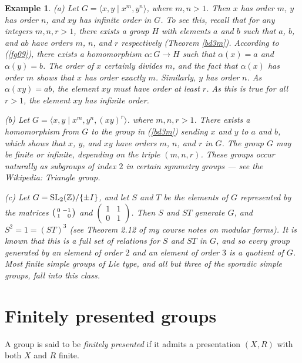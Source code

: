 \documentclass[a4paper,11pt,final,openany]{memoir}%
\newtheorem{example}[X]{Example}
\theoremstyle{nonumberplain}
\begin{document}
\begin{example}
\label{fg10a}(a) Let $G=\langle x,y\mid x^{m},y^{n}\rangle$, where $m,n>1$.
Then $x$ has order $m$, $y$ has order $n$, and $xy$ has infinite order in $G$.
To see this, recall that for any integers $m,n,r>1$, there exists a group $H$
with elements $a$ and $b$ such that $a$, $b$, and $ab$ have orders $m$, $n$,
and $r$ respectively (Theorem \ref{bd3m}). According to (\ref{fg09}), there
exists a homomorphism $\alpha\colon G\rightarrow H$ such that $\alpha(x)=a$
and $\alpha(y)=b$. The order of $x$ certainly divides $m$, and the fact that
$\alpha(x)$ has order $m$ shows that $x$ has order exactly $m$. Similarly, $y$
has order $n$. As $\alpha(xy)=ab$, the element $xy$ must have order at least
$r$. As this is true for all $r>1$, the element $xy$ has infinite order.

(b) Let $G=\langle x,y\mid x^{m},y^{n},(xy)^{r}\rangle$. where $m,n,r>1$.
There exists a homomorphism from $G$ to the group in (\ref{bd3m}) sending $x$
and $y$ to $a$ and $b$, which shows that $x$, $y$, and $xy$ have orders $m$,
$n$, and $r$ in $G$. The group $G$ may be finite or infinite, depending on the
triple $(m,n,r)$. These groups occur naturally as subgroups of index $2$ in
certain symmetry groups --- see the Wikipedia: Triangle group.

(c) Let $G=\operatorname{SL}_{2}(\mathbb{Z}{})/\{\pm I\}$, and let $S$ and $T$ be the
elements of $G$ represented by the matrices $\left(
\begin{smallmatrix}
0 & -1\\
1 & \hfill0
\end{smallmatrix}
\right)  $ and $\left(
\begin{smallmatrix}
1 & 1\\
0 & 1
\end{smallmatrix}
\right)  $. Then $S$ and $ST$ generate $G$, and $S^{2}=1=(ST)^{3}$ (see
Theorem 2.12 of my course notes on modular forms). It is known that this is a
full set of relations for $S$ and $ST$ in $G$, and so every group generated by
an element of order $2$ and an element of order $3$ is a quotient of $G$. Most
finite simple groups of Lie type, and all but three of the sporadic simple
groups, fall into this class.
\end{example}

\section{Finitely presented groups}

A group is said to be \emph{finitely presented\/}%
if it admits a presentation $(X,R)$ with both $X$ and $R$ finite.
\end{document}
